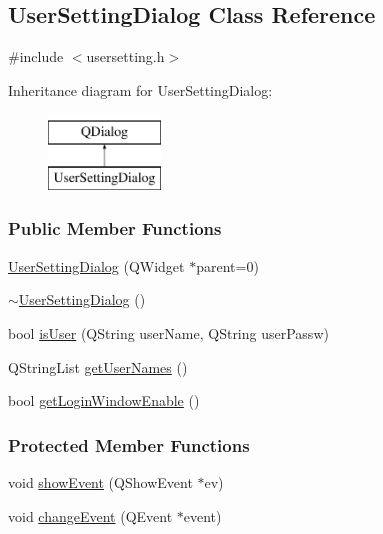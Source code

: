 \hypertarget{classUserSettingDialog}{}\subsection{User\+Setting\+Dialog Class Reference}
\label{classUserSettingDialog}


{\ttfamily \#include $<$usersetting.\+h$>$}

Inheritance diagram for User\+Setting\+Dialog\+:\begin{figure}[H]
\begin{center}
\leavevmode
\includegraphics[height=2.000000cm]{classUserSettingDialog}
\end{center}
\end{figure}
\subsubsection*{Public Member Functions}
\begin{DoxyCompactItemize}
\item 
\mbox{\hyperlink{classUserSettingDialog_a8d3526dd76e3bf77fb8e02e1febeb8e4}{User\+Setting\+Dialog}} (Q\+Widget $\ast$parent=0)
\item 
\mbox{\hyperlink{classUserSettingDialog_a49def01d834dfdd9df00ce9fd6c6f4dc}{$\sim$\+User\+Setting\+Dialog}} ()
\item 
bool \mbox{\hyperlink{classUserSettingDialog_a10640f3e9a3935beba233c3bf7f1bb63}{is\+User}} (Q\+String user\+Name, Q\+String user\+Passw)
\item 
Q\+String\+List \mbox{\hyperlink{classUserSettingDialog_a96352f86848e37e60ef1b47c410ea676}{get\+User\+Names}} ()
\item 
bool \mbox{\hyperlink{classUserSettingDialog_a168420a490436fdb3a3b101b7e4e9fe3}{get\+Login\+Window\+Enable}} ()
\end{DoxyCompactItemize}
\subsubsection*{Protected Member Functions}
\begin{DoxyCompactItemize}
\item 
void \mbox{\hyperlink{classUserSettingDialog_ad1fd64225d23d8d49e9599aeffb9a235}{show\+Event}} (Q\+Show\+Event $\ast$ev)
\item 
void \mbox{\hyperlink{classUserSettingDialog_ad3b91400bb71ef025235bd9bee2551ac}{change\+Event}} (Q\+Event $\ast$event)
\end{DoxyCompactItemize}
